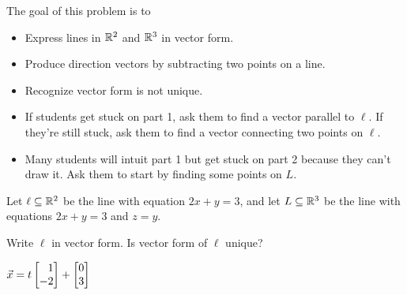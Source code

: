 \documentclass{workbook}
\newcommand{\bookonlynewpage}{\begin{bookonly}\newpage\end{bookonly}}
\begin{document}
\begin{slide}
	\bookonlynewpage

	\question
	\begin{annotation}
		\begin{goals}

			The goal of this problem is to
			\begin{itemize}
				\item Express lines in $\mathbb{R}^2$ and $\mathbb{R}^3$ in
					vector form.
				\item Produce direction vectors by subtracting two points
					on a line.
				\item Recognize vector form is not unique.
			\end{itemize}
		\end{goals}

		\begin{notes}
			\begin{itemize}
				\item If students get stuck on part 1, ask them
					to find a vector parallel to $\ell$. If
					they're still stuck, ask them to find a vector
					connecting two points on $\ell$.
				\item Many students will intuit part 1 but get stuck on
					part 2 because they can't draw it. Ask them
					to start by finding some points on $L$.
			\end{itemize}
		\end{notes}
	\end{annotation}
	Let $\ell\subseteq \mathbb{R}^2$ be the line with equation $2x+y=3$,
	and let $L\subseteq \mathbb{R}^3$ be the line with equations $2x+y=3$ and
	$z=y$.
	\begin{parts}
		\item Write $\ell$ in vector form. Is vector form of $\ell$ unique?
			\begin{solution}
				$\vec x = t \mat{1 \\ -2} + \mat{0 \\ 3}$


\end{solution}
\end{parts}
\end{slide}
\end{document}
